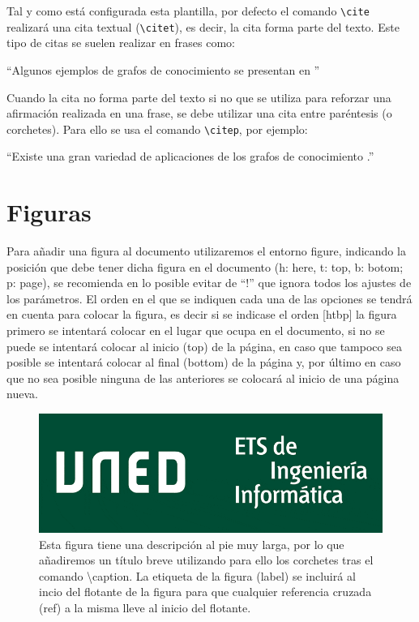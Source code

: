 Tal y como está configurada esta plantilla, por defecto el comando \verb|\cite| realizará una cita textual (\verb|\citet|), es decir, la cita forma parte del texto. Este tipo de citas se suelen realizar en frases como: 

``Algunos ejemplos de grafos de conocimiento se presentan en \citet{ji2020survey}'' 

Cuando la cita no forma parte del texto si no que se utiliza para reforzar una afirmación realizada en una frase, se debe utilizar una cita entre paréntesis (o corchetes). Para ello se usa el comando \verb|\citep|, por ejemplo:

``Existe una gran variedad de aplicaciones de los grafos de conocimiento \citep{ji2020survey}.''


\section{Figuras}
Para añadir una figura al documento utilizaremos el entorno figure, indicando la posición que debe tener dicha figura en el documento (h: here, t: top, b: botom; p: page), se recomienda en lo posible evitar de ``!'' que ignora todos los ajustes de los parámetros. El orden en el que se indiquen cada una de las opciones se tendrá en cuenta para colocar la figura, es decir si se indicase el orden [htbp] la figura primero se intentará colocar en el lugar que ocupa en el documento, si no se puede se intentará colocar al inicio (top) de la página, en caso que tampoco sea posible se intentará colocar al final (bottom) de la página y, por último en caso que no sea posible ninguna de las anteriores se colocará al inicio de una página nueva.

\begin{figure}[ht]
\begin{centering}
\includegraphics[width=0.5\columnwidth]{imagenes/logo_informatica.png}
\par\end{centering}

\caption[Ejemplo de figura]{Esta figura tiene una descripción al pie muy larga, por lo que añadiremos un título breve utilizando para ello los corchetes tras el comando \textbackslash caption. La etiqueta de la figura (label) se incluirá al incio del flotante de la figura para que cualquier referencia cruzada (ref) a la misma lleve al inicio del flotante.\label{fig:Ejemplo-de-figura}}
\end{figure}

